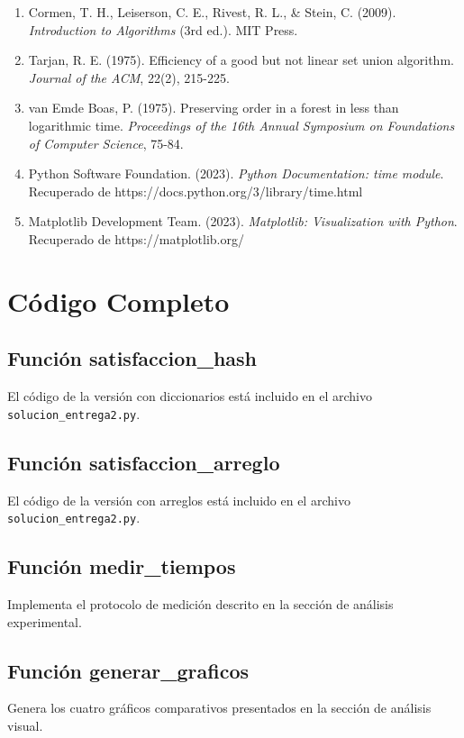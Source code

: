 \documentclass[12pt,letterpaper]{article}
\begin{document}
\begin{enumerate}
    \item Cormen, T. H., Leiserson, C. E., Rivest, R. L., \& Stein, C. (2009). \textit{Introduction to Algorithms} (3rd ed.). MIT Press.
    \item Tarjan, R. E. (1975). Efficiency of a good but not linear set union algorithm. \textit{Journal of the ACM}, 22(2), 215-225.
    \item van Emde Boas, P. (1975). Preserving order in a forest in less than logarithmic time. \textit{Proceedings of the 16th Annual Symposium on Foundations of Computer Science}, 75-84.
    \item Python Software Foundation. (2023). \textit{Python Documentation: time module}. Recuperado de https://docs.python.org/3/library/time.html
    \item Matplotlib Development Team. (2023). \textit{Matplotlib: Visualization with Python}. Recuperado de https://matplotlib.org/
\end{enumerate}

\appendix

\section{Código Completo}

\subsection{Función satisfaccion\_hash}

El código de la versión con diccionarios está incluido en el archivo \texttt{solucion\_entrega2.py}.

\subsection{Función satisfaccion\_arreglo}

El código de la versión con arreglos está incluido en el archivo \texttt{solucion\_entrega2.py}.

\subsection{Función medir\_tiempos}

Implementa el protocolo de medición descrito en la sección de análisis experimental.

\subsection{Función generar\_graficos}

Genera los cuatro gráficos comparativos presentados en la sección de análisis visual.
\end{document}
